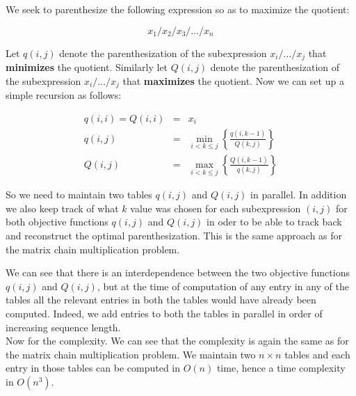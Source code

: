 
We seek to parenthesize the following expression so as to maximize the quotient:

\[
  x_1 / x_2 / x_3 / \dots / x_n
\]

Let $q(i, j)$ denote the parenthesization of the subexpression $x_i / \dots / x_j$ that \textbf{minimizes} the quotient. Similarly let $Q(i, j)$ denote the parenthesization of the subexpression $x_i / \dots / x_j$ that \textbf{maximizes} the quotient. Now we can set up a simple recursion as follows:

\[
\begin{array}{rcl}
 q(i, i) = Q(i, i) & = & x_i \\
 q(i, j) & = & \min\limits_{i < k \leq j} \left\{\frac{q(i, k-1)}{Q(k, j)}\right\} \\
 Q(i, j) & = & \max\limits_{i < k \leq j} \left\{\frac{Q(i, k-1)}{q(k, j)}\right\}
\end{array}
\]

So we need to maintain two tables $q(i,j)$ and $Q(i,j)$ in parallel. In addition we also keep track of what $k$ value was chosen for each subexpression $(i, j)$ for both objective functions  $q(i,j)$ and $Q(i,j)$ in oder to be able to track back and reconstruct the optimal parenthesization. This is the same approach as for the matrix chain multiplication problem.

We can see that there is an interdependence between the two objective functions $q(i,j)$ and $Q(i,j)$, but at the time of computation of any entry in any of the tables all the relevant entries in both the tables would have already been computed. Indeed, we add entries to both the tables in parallel in order of increasing sequence length.\\

Now for the complexity. We can see that the complexity is again the same as for the matrix chain multiplication problem. We maintain two $n \times n$ tables and each entry in those tables can be computed in $O(n)$ time, hence a time complexity in $O(n^3)$.



